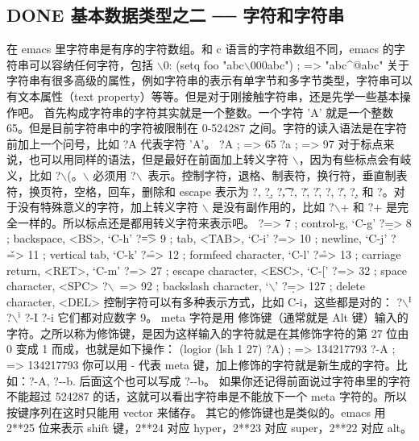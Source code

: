 \documentclass[11pt]{ctexart}
\begin{document}
\subsection{{\bfseries\sffamily DONE} 基本数据类型之二 ── 字符和字符串}
\label{sec:org2ae4550}
在 emacs 里字符串是有序的字符数组。和 c 语言的字符串数组不同，emacs 的字符串可以容纳任何字符，包括 $\backslash$0:
(setq foo "abc$\backslash$000abc")                 ; => "abc\^{}@abc"
关于字符串有很多高级的属性，例如字符串的表示有单字节和多字节类型，字符串可以有文本属性（text property）等等。但是对于刚接触字符串，还是先学一些基本操作吧。
首先构成字符串的字符其实就是一个整数。一个字符 'A' 就是一个整数 65。但是目前字符串中的字符被限制在 0-524287 之间。字符的读入语法是在字符前加上一个问号，比如 ?A 代表字符 'A'。
?A                                      ; => 65
?a                                      ; => 97
对于标点来说，也可以用同样的语法，但是最好在前面加上转义字符 $\backslash$，因为有些标点会有岐义，比如 ?$\backslash$(。$\backslash$ 必须用 ?$\backslash$\ 表示。控制字符，退格、制表符，换行符，垂直制表符，换页符，空格，回车，删除和 escape 表示为 ?\a, ?\b, ?\t, ?\n, ?\v, ?\f, ?\s, ?\r, ?\d, 和 ?\e。对于没有特殊意义的字符，加上转义字符 $\backslash$ 是没有副作用的，比如 ?$\backslash$+ 和 ?+ 是完全一样的。所以标点还是都用转义字符来表示吧。
?\a => 7                 ; control-g, `C-g'
?\b => 8                 ; backspace, <BS>, `C-h'
?\t => 9                 ; tab, <TAB>, `C-i'
?\n => 10                ; newline, `C-j'
?\v => 11                ; vertical tab, `C-k'
?\f => 12                ; formfeed character, `C-l'
?\r => 13                ; carriage return, <RET>, `C-m'
?\e => 27                ; escape character, <ESC>, `C-['
?\s => 32                ; space character, <SPC>
?$\backslash$\ => 92                ; backslash character, `$\backslash$'
?\d => 127               ; delete character, <DEL>
控制字符可以有多种表示方式，比如 C-i，这些都是对的：
?$\backslash$\(^{\text{I}}\)  ?$\backslash$\(^{\text{i}}\)  ?\C-I  ?\C-i
它们都对应数字 9。
meta 字符是用 修饰键（通常就是 Alt 键）输入的字符。之所以称为修饰键，是因为这样输入的字符就是在其修饰字符的第 27 位由 0 变成 1 而成，也就是如下操作：
(logior (lsh 1 27) ?A)                  ; => 134217793
?\M-A                                   ; => 134217793
你可以用 \M- 代表 meta 键，加上修饰的字符就是新生成的字符。比如：?\M-A, ?\M-\C-b. 后面这个也可以写成 ?\C-\M-b。
如果你还记得前面说过字符串里的字符不能超过 524287 的话，这就可以看出字符串是不能放下一个 meta 字符的。所以按键序列在这时只能用 vector 来储存。
其它的修饰键也是类似的。emacs 用 2**25 位来表示 shift 键，2**24 对应 hyper，2**23 对应 super，2**22 对应 alt。
\end{document}
